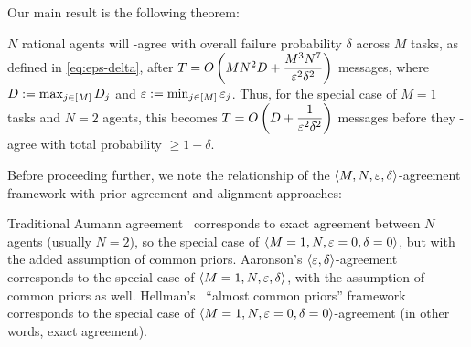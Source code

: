 Our main result is the following theorem:
\begin{theorem}\label{thm:ub}
$N$ rational agents will \agree-agree with overall failure probability $\delta$ across $M$ tasks, as defined in \eqref{eq:eps-delta}, after $T = O\left(MN^2 D + \dfrac{M^3N^7}{\varepsilon^2\delta^2}\right)$ messages, where $D := \max_{j \in [M]} D_j$ and $\varepsilon := \min_{j \in [M]}\varepsilon_j$.
Thus, for the special case of $M=1$ tasks and $N=2$ agents, this becomes $T = O\left(D + \dfrac{1}{\varepsilon^2\delta^2}\right)$ messages before they \agree-agree with total probability $\ge 1-\delta$.
\end{theorem}

Before proceeding further, we note the relationship of the $\left \langle M, N, \varepsilon, \delta \right \rangle $-agreement framework with prior agreement and alignment approaches:
\begin{remark}\label{rem:agree}
Traditional Aumann agreement~\citep{aumann1976agreeing} corresponds to exact agreement between $N$ agents (usually $N=2$), so the special case of $\left \langle M=1, N, \varepsilon = 0, \delta = 0 \right \rangle $, but with the added assumption of common priors.
Aaronson's $\left \langle \varepsilon, \delta \right \rangle $-agreement~\citep{aaronson2005complexity} corresponds to the special case of $\left \langle M=1, N, \varepsilon, \delta \right \rangle $, with the assumption of common priors as well.
Hellman's~\citep{hellman2013almost} ``almost common priors'' framework corresponds to the special case of $\left \langle M=1, N, \varepsilon=0,\delta=0 \right \rangle $-agreement (in other words, exact agreement).
\end{remark}

